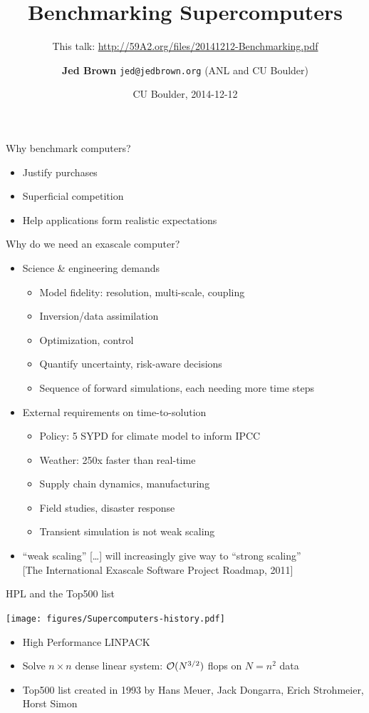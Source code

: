 \documentclass{beamer}
\title{Benchmarking Supercomputers}
\subtitle{This talk: \url{http://59A2.org/files/20141212-Benchmarking.pdf}}
\author{{\bf Jed Brown} \texttt{jed@jedbrown.org} (ANL and CU Boulder)}
\date{CU Boulder, 2014-12-12}
\begin{document}
\lstset{language=C}
\normalem

\begin{frame}
  \titlepage
\end{frame}

\begin{frame}{Why benchmark computers?}
  \begin{itemize}
  \item Justify purchases
  \item Superficial competition
  \item Help applications form realistic expectations
  \end{itemize}
\end{frame}

\begin{frame}{Why do we need an exascale computer?}
  \begin{itemize}
  \item Science \& engineering demands
    \begin{itemize}
    \item Model fidelity: resolution, multi-scale, coupling
    \item Inversion/data assimilation
    \item Optimization, control
    \item Quantify uncertainty, risk-aware decisions
    \item Sequence of forward simulations, each needing more time steps
    \end{itemize}
  \item External requirements on time-to-solution
    \begin{itemize}
    \item Policy: 5 SYPD for climate model to inform IPCC
    \item Weather: 250x faster than real-time
    \item Supply chain dynamics, manufacturing
    \item Field studies, disaster response
    \item Transient simulation is not weak scaling
    \end{itemize}
  \item ``weak scaling'' [\ldots] will increasingly give way to ``strong scaling''\\
    {\small [The International Exascale Software Project Roadmap, 2011]}
  \end{itemize}
\end{frame}

\begin{frame}{HPL and the Top500 list}
  \begin{center}
    \texttt{[image: figures/Supercomputers-history.pdf]}
  \end{center}
  \begin{itemize}
  \item High Performance LINPACK
  \item Solve $n\times n$ dense linear system: $\mathcal{O}(N^{3/2})$ flops on $N=n^2$ data
  \item Top500 list created in 1993 by Hans Meuer, Jack Dongarra, Erich
    Strohmeier, Horst Simon
  \end{itemize}
\end{frame}
\end{document}
